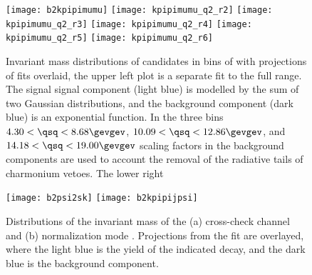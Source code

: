 










\begin{figure}
  \begin{center}
    \texttt{[image: b2kpipimumu]}
    \texttt{[image: kpipimumu\_q2\_r2]}
    \texttt{[image: kpipimumu\_q2\_r3]}
    \texttt{[image: kpipimumu\_q2\_r4]}
    \texttt{[image: kpipimumu\_q2\_r5]}
    \texttt{[image: kpipimumu\_q2\_r6]}
    \caption{\small
      Invariant mass distributions of \btokpipimumu candidates in bins of \qsq with projections of
      fits overlaid, the upper left plot is a separate fit to the full \qsq range.
      The signal signal component (light blue) is modelled by the sum of two Gaussian
      distributions, and the background component (dark blue) is an exponential function.
      In the three \qsq bins $4.30<\qsq<8.68\gevgev$, $10.09<\qsq<12.86\gevgev$, and
      $14.18<\qsq<19.00\gevgev$ scaling factors in the background components are used to account
      the removal of the radiative tails of charmonium vetoes.
      The lower right
    }
    \label{}
  \end{center}
\end{figure}



\begin{figure}
  \begin{center}
    \texttt{[image: b2psi2sk]}
    \texttt{[image: b2kpipijpsi]}
    \caption{\small
      Distributions of the invariant mass of the
      (a) cross-check channel \btojpsikpipi and
      (b) normalization mode \btopsitwosk.
      Projections from the fit are overlayed, where the light blue is the yield of the indicated
      decay, and the dark blue is the background component.
    }
    \label{fig:hhh:norm}
  \end{center}
\end{figure}



